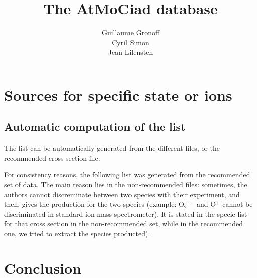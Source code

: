 \documentclass[a4paper,12pt]{book}
\author{Guillaume Gronoff \\ Cyril Simon\\ Jean Lilensten}
\title{The \textbf{AtMoCiad} database}
\begin{document}
\maketitle
\tableofcontents



%







%


%
%

\chapter{Sources for specific state or ions}
\section{Automatic computation of the list}
The list can be automatically generated from the different files, or the recommended cross section file.

For consistency reasons, the following list was generated from the recommended set of data. The main reason lies in the non-recommended files: sometimes, the authors cannot discreminate between two species with their experiment, and then, gives the production for the two species (example: O$_2^{++}$ and O$^+$ cannot be discriminated in standard ion mass spectrometer). It is stated in the specie list for that cross section in the non-recommended set, while  in the recommended one, we tried to extract the species producted).


%






\chapter{Conclusion}
\end{document}
